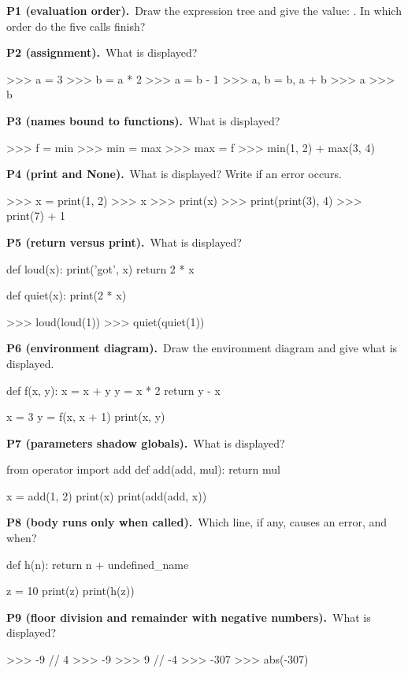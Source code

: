 \documentclass[10pt]{scrartcl}
\begin{document}
\begin{prob}\textbf{P1 (evaluation order).}\ Draw the expression tree and give the value: . In which order do the five calls finish?
\end{prob}
\begin{prob}\textbf{P2 (assignment).}\ What is displayed?
\begin{py}
>>> a = 3
>>> b = a * 2
>>> a = b - 1
>>> a, b = b, a + b
>>> a
>>> b
\end{py}
\end{prob}
\begin{prob}\textbf{P3 (names bound to functions).}\ What is displayed?
\begin{py}
>>> f = min
>>> min = max
>>> max = f
>>> min(1, 2) + max(3, 4)
\end{py}
\end{prob}
\begin{prob}\textbf{P4 (print and None).}\ What is displayed? Write  if an error occurs.
\begin{py}
>>> x = print(1, 2)
>>> x
>>> print(x)
>>> print(print(3), 4)
>>> print(7) + 1
\end{py}
\end{prob}
\begin{prob}\textbf{P5 (return versus print).}\ What is displayed?
\begin{py}
def loud(x):
    print('got', x)
    return 2 * x

def quiet(x):
    print(2 * x)

>>> loud(loud(1))
>>> quiet(quiet(1))
\end{py}
\end{prob}
\begin{prob}\textbf{P6 (environment diagram).}\ Draw the environment diagram and give what is displayed.
\begin{py}
def f(x, y):
    x = x + y
    y = x * 2
    return y - x

x = 3
y = f(x, x + 1)
print(x, y)
\end{py}
\end{prob}
\begin{prob}\textbf{P7 (parameters shadow globals).}\ What is displayed?
\begin{py}
from operator import add
def add(add, mul):
    return mul

x = add(1, 2)
print(x)
print(add(add, x))
\end{py}
\end{prob}
\begin{prob}\textbf{P8 (body runs only when called).}\ Which line, if any, causes an error, and when?
\begin{py}
def h(n):
    return n + undefined_name

z = 10
print(z)
print(h(z))
\end{py}
\end{prob}
\begin{prob}\textbf{P9 (floor division and remainder with negative numbers).}\ What is displayed?
\begin{py}
>>> -9 // 4
>>> -9 %
>>> 9 // -4
>>> -307 %
>>> abs(-307) %
\end{py}
\end{prob}
\end{document}
